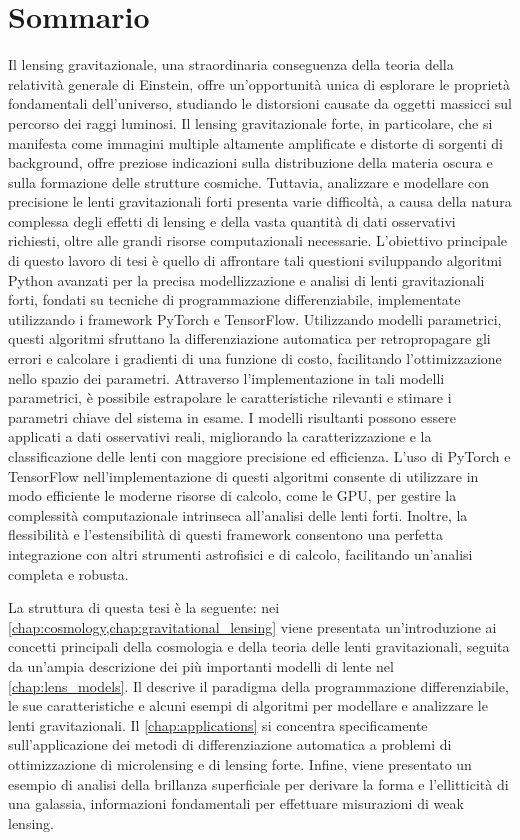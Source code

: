 \chapter*{Sommario}
\pagestyle{empty}


Il lensing gravitazionale, una straordinaria conseguenza della teoria della relatività generale di Einstein, offre un'opportunità unica di esplorare le proprietà fondamentali dell'universo, studiando le distorsioni causate da oggetti massicci sul percorso dei raggi luminosi. Il lensing gravitazionale forte, in particolare, che si manifesta come immagini multiple altamente amplificate e distorte di sorgenti di background, offre preziose indicazioni sulla distribuzione della materia oscura e sulla formazione delle strutture cosmiche. Tuttavia, analizzare e modellare con precisione le lenti gravitazionali forti presenta varie difficoltà, a causa della natura complessa degli effetti di lensing e della vasta quantità di dati osservativi richiesti, oltre alle grandi risorse computazionali necessarie.
L'obiettivo principale di questo lavoro di tesi è quello di affrontare tali questioni sviluppando algoritmi Python avanzati per la precisa modellizzazione e analisi di lenti gravitazionali forti, fondati su tecniche di programmazione differenziabile, implementate utilizzando i framework PyTorch e TensorFlow.
Utilizzando modelli parametrici, questi algoritmi sfruttano la differenziazione automatica per retropropagare gli errori e calcolare i gradienti di una funzione di costo, facilitando l'ottimizzazione nello spazio dei parametri.
Attraverso l'implementazione in tali modelli parametrici, è possibile estrapolare le caratteristiche rilevanti e stimare i parametri chiave del sistema in esame. I modelli risultanti possono essere applicati a dati osservativi reali, migliorando la caratterizzazione e la classificazione delle lenti con maggiore precisione ed efficienza.
L'uso di PyTorch e TensorFlow nell'implementazione di questi algoritmi consente di utilizzare in modo efficiente le moderne risorse di calcolo, come le GPU, per gestire la complessità computazionale intrinseca all'analisi delle lenti forti. Inoltre, la flessibilità e l'estensibilità di questi framework consentono una perfetta integrazione con altri strumenti astrofisici e di calcolo, facilitando un'analisi completa e robusta.

La struttura di questa tesi è la seguente: nei \cref{chap:cosmology,chap:gravitational_lensing} viene presentata un'introduzione ai concetti principali della cosmologia e della teoria delle lenti gravitazionali, seguita da un'ampia descrizione dei più importanti modelli di lente nel \cref{chap:lens_models}. Il  descrive il paradigma della programmazione differenziabile, le sue caratteristiche e alcuni esempi di algoritmi per modellare e analizzare le lenti gravitazionali. Il \cref{chap:applications} si concentra specificamente sull'applicazione dei metodi di differenziazione automatica a problemi di ottimizzazione di microlensing e di lensing forte. Infine, viene presentato un esempio di analisi della brillanza superficiale per derivare la forma e l'ellitticità di una galassia, informazioni fondamentali per effettuare misurazioni di weak lensing.
